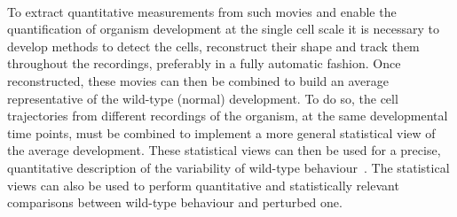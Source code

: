 \paragraph{}To extract quantitative measurements from such movies and enable the quantification of organism development at the single cell scale it is necessary to develop methods to detect the cells, reconstruct their shape and track them throughout the recordings, preferably in a fully automatic fashion.
Once reconstructed, these movies can then be combined to build an average representative of the wild-type (normal) development.
To do so, the cell trajectories from different recordings of the organism, at the same developmental time points, must be combined to implement a more general statistical view of the average development.
These statistical views can then be used for a precise, quantitative description of the variability of wild-type behaviour~\cite{Wolff:2018aa,Li2019,Guignard2020}.
The statistical views can also be used to perform quantitative and statistically relevant comparisons between wild-type behaviour and perturbed one.

